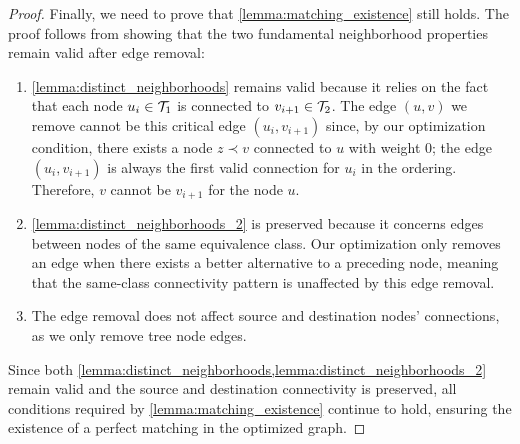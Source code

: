 \begin{proof}
    Finally, we need to prove that \cref{lemma:matching_existence} still holds. The proof follows from showing that the two fundamental neighborhood properties remain valid after edge removal:
    \begin{enumerate}[leftmargin=25pt]
        \item \cref{lemma:distinct_neighborhoods} remains valid because it relies on the fact that each node $u_i \in \mathcal{T}_{1}$ is connected to $v_{i+1} \in \mathcal{T}_{2}$. The edge $(u,v)$ we remove cannot be this critical edge $(u_i,v_{i+1})$ since, by our optimization condition, there exists a node $z \prec v$ connected to $u$ with weight 0; the edge $(u_i,v_{i+1})$ is always the first valid connection for $u_i$ in the ordering. Therefore, $v$ cannot be $v_{i+1}$ for the node $u$.
        \item \cref{lemma:distinct_neighborhoods_2} is preserved because it concerns edges between nodes of the same equivalence class. Our optimization only removes an edge when there exists a better alternative to a preceding node, meaning that the same-class connectivity pattern is unaffected by this edge removal.
        \item The edge removal does not affect source and destination nodes' connections, as we only remove tree node edges.
    \end{enumerate}

    Since both \cref{lemma:distinct_neighborhoods,lemma:distinct_neighborhoods_2} remain valid and the source and destination connectivity is preserved, all conditions required by \cref{lemma:matching_existence} continue to hold, ensuring the existence of a perfect matching in the optimized graph.

     
\end{proof}

